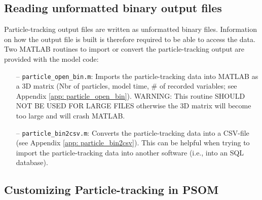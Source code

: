 \documentclass[12pt,letterpaper,titlepage]{article}
\begin{document}
\subsection{Reading unformatted binary output files}
Particle-tracking output files are written as unformatted binary files. Information on how the output file is built is therefore required to be able to access the data. Two MATLAB routines to import or convert the particle-tracking output are provided with the model code:
\begin{enumerate}
	\item [--] \texttt{particle\_open\_bin.m}: Imports the particle-tracking data into MATLAB as a 3D matrix (Nbr of particles, model time, \# of recorded variables; see Appendix \ref{app: particle_open_bin}). WARNING: This routine SHOULD NOT BE USED FOR LARGE FILES otherwise the 3D matrix will become too large and will crash MATLAB.
	\item [--] \texttt{particle\_bin2csv.m}: Converts the particle-tracking data into a CSV-file (see Appendix \ref{app: particle_bin2csv}). This can be helpful when trying to import the particle-tracking data into another software (i.e., into an SQL database).
\end{enumerate}


\subsection{Customizing Particle-tracking in PSOM}
\label{sec: myparticletracking}
\end{document}
